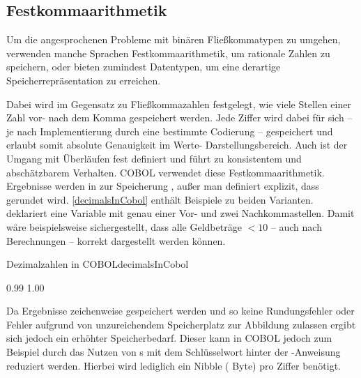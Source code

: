 \subsection*{Festkommaarithmetik}
Um die angesprochenen Probleme mit binären Fließkommatypen zu umgehen, verwenden manche Sprachen Festkommaarithmetik, um rationale Zahlen zu speichern, oder bieten zumindest Datentypen, um eine derartige Speicherrepräsentation zu erreichen. 

Dabei wird im Gegensatz zu Fließkommazahlen festgelegt, wie viele Stellen einer Zahl vor- \bzw nach dem Komma gespeichert werden. Jede Ziffer wird dabei für sich -- je nach Implementierung durch eine bestimmte Codierung -- gespeichert und erlaubt somit absolute Genauigkeit im Werte- \bzw Darstellungsbereich. Auch ist der Umgang mit Überläufen fest definiert und führt zu konsistentem und abschätzbarem Verhalten. COBOL verwendet diese Festkommaarithmetik. Ergebnisse werden in zur Speicherung , außer man definiert explizit, dass gerundet wird. \autoref{decimalsInCobol} enthält Beispiele zu beiden Varianten.  deklariert eine Variable mit genau einer Vor- und zwei Nachkommastellen. Damit wäre beispielsweise sichergestellt, dass alle Geldbeträge $<10$ -- auch nach Berechnungen -- korrekt dargestellt werden können.

\begin{codeWithCaption}{Dezimalzahlen in COBOL}{decimalsInCobol}
    \begin{shellwindow}
    0.99
    1.00
    \end{shellwindow}
\end{codeWithCaption}

Da Ergebnisse zeichenweise gespeichert werden und so keine Rundungsfehler oder Fehler aufgrund von unzureichendem Speicherplatz zur Abbildung zulassen ergibt sich jedoch ein erhöhter Speicherbedarf. Dieser kann in COBOL jedoch zum Beispiel durch das Nutzen von s mit dem Schlüsselwort  hinter der -Anweisung reduziert werden. Hierbei wird lediglich ein Nibble ( Byte) pro Ziffer benötigt.

